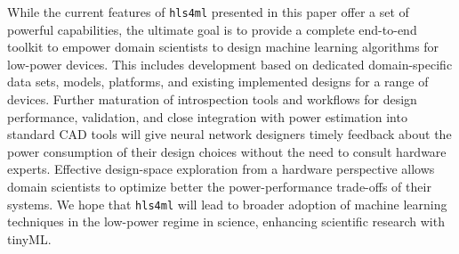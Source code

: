 \documentclass[tinyml]{acmart}
\newcommand{\hlsfml}{\texttt{hls4ml}\xspace}
\begin{document}
While the current features of \hlsfml presented in this paper offer a set of powerful capabilities, the ultimate goal is to provide a complete end-to-end toolkit to empower domain scientists to design machine learning algorithms for low-power devices.
This includes development based on dedicated domain-specific data sets, models, platforms, and existing implemented designs for a range of devices.
Further maturation of introspection tools and workflows for design performance, validation, and close integration with power estimation into standard CAD tools will give neural network designers timely feedback about the power consumption of their design choices without the need to consult hardware experts. %
Effective design-space exploration from a hardware perspective allows domain scientists to optimize better the power-performance trade-offs of their systems.
We hope that \hlsfml will lead to broader adoption of machine learning techniques in the low-power regime in science, enhancing scientific research with tinyML.


\end{document}
